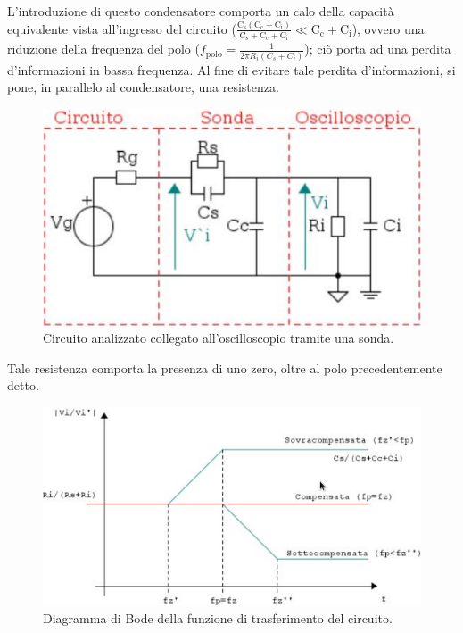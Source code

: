 \documentclass[a4paper]{article}
\begin{document}
			\newpage
			L'introduzione di questo condensatore comporta un calo della capacità equivalente vista all'ingresso del circuito ($ \mathrm{\frac{C_{s} (C_{c} + C_{i})}{C_{s} + C_{c} + C_{i}} \ll C_{c} + C_{i}} $), ovvero una riduzione della frequenza del polo ($ f_{\mathrm{polo}} = \frac{1}{2\pi R_{i} (C_{s} + C_{i})} $); ciò porta ad una perdita d'informazioni in bassa frequenza.
			\newline
			Al fine di evitare tale perdita d'informazioni, si pone, in parallelo al condensatore, una resistenza.
			\begin{figure}[h!]
				\centering
				\includegraphics[scale=0.4]{theveninSondaDSOResistenza}
				\caption{Circuito analizzato collegato all'oscilloscopio tramite una sonda.}
				\label{fig:theveninSondaDSOResistenza}
			\end{figure}
			\newline
			Tale resistenza comporta la presenza di uno zero, oltre al polo precedentemente detto.
			\begin{figure}[h!]
				\centering
				\includegraphics[scale=0.4]{sondaBode}
				\caption{Diagramma di Bode della funzione di trasferimento del circuito.}
				\label{fig:sondaBode}
			\end{figure}
\end{document}

